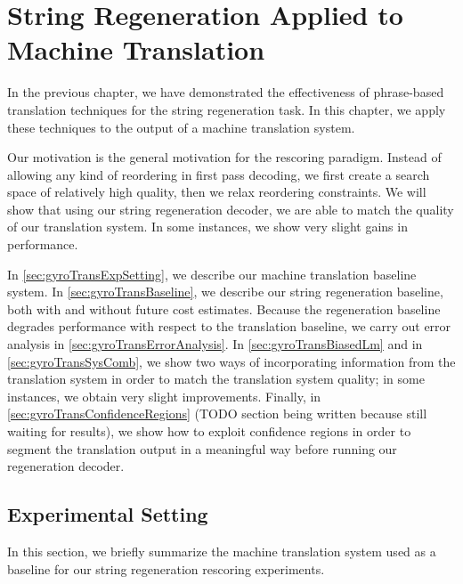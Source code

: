 \chapter{String Regeneration Applied to Machine Translation}


In the previous chapter, we
have demonstrated the effectiveness of phrase-based
translation techniques for the string regeneration task.
In this chapter, we apply these techniques to the output
of a machine translation system.

Our motivation is the general motivation for the rescoring paradigm.
Instead of allowing any kind of reordering in first pass
decoding, we first create a search space of relatively high
quality, then we relax reordering constraints.
We will show that using our string regeneration decoder,
we are able to match the quality of our translation
system. In some instances, we show very slight gains in
performance.

In \autoref{sec:gyroTransExpSetting}, we describe
our machine translation baseline system.
In \autoref{sec:gyroTransBaseline}, we describe
our string regeneration baseline, both with and without
future cost estimates. Because the regeneration baseline
degrades performance with respect to the translation
baseline, we carry out error analysis
in \autoref{sec:gyroTransErrorAnalysis}.
In \autoref{sec:gyroTransBiasedLm} and
in \autoref{sec:gyroTransSysComb}, we show two ways of incorporating
information from the translation system in order to match
the translation system quality; in some instances,
we obtain very slight improvements.
Finally, in \autoref{sec:gyroTransConfidenceRegions} (TODO section being written
because still waiting for results), we show
how to exploit confidence regions in order to segment
the translation output in a meaningful way before running
our regeneration decoder.

\section{Experimental Setting}
\label{sec:gyroTransExpSetting}

In this section, we briefly summarize the machine translation
system used as a baseline for our string regeneration rescoring
experiments.

